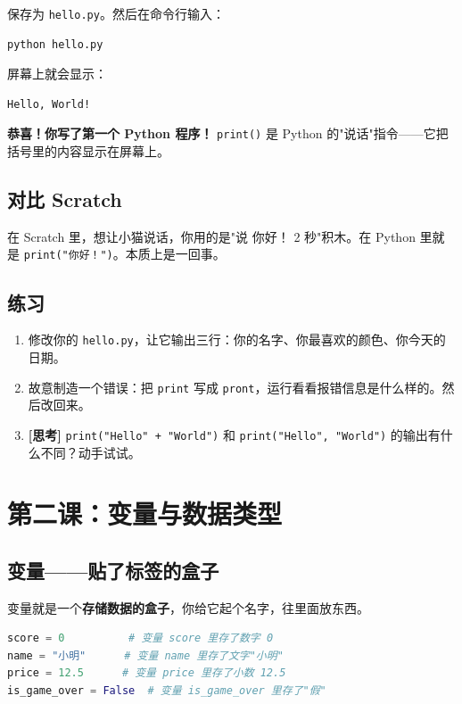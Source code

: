 \documentclass[a4paper,12pt]{ctexart}
\begin{document}
保存为 \texttt{hello.py}。然后在命令行输入：

\begin{lstlisting}[language=bash]
python hello.py
\end{lstlisting}

屏幕上就会显示：

\begin{lstlisting}
Hello, World!
\end{lstlisting}

\textbf{恭喜！你写了第一个 Python 程序！} \texttt{print()} 是 Python 的"说话"指令——它把括号里的内容显示在屏幕上。

\subsection*{对比 Scratch}

在 Scratch 里，想让小猫说话，你用的是"说 你好！ 2 秒"积木。在 Python 里就是 \texttt{print("你好！")}。本质上是一回事。

\subsection*{练习}

\begin{enumerate}
  \item 修改你的 \texttt{hello.py}，让它输出三行：你的名字、你最喜欢的颜色、你今天的日期。
  \item 故意制造一个错误：把 \texttt{print} 写成 \texttt{pront}，运行看看报错信息是什么样的。然后改回来。
  \item \textbf{[思考]} \texttt{print("Hello" + "World")} 和 \texttt{print("Hello", "World")} 的输出有什么不同？动手试试。
\end{enumerate}

\section*{第二课：变量与数据类型}

\subsection*{变量——贴了标签的盒子}

变量就是一个\textbf{存储数据的盒子}，你给它起个名字，往里面放东西。

\begin{lstlisting}[language=Python]
score = 0          # 变量 score 里存了数字 0
name = "小明"      # 变量 name 里存了文字"小明"
price = 12.5      # 变量 price 里存了小数 12.5
is_game_over = False  # 变量 is_game_over 里存了"假"
\end{lstlisting}
\end{document}
